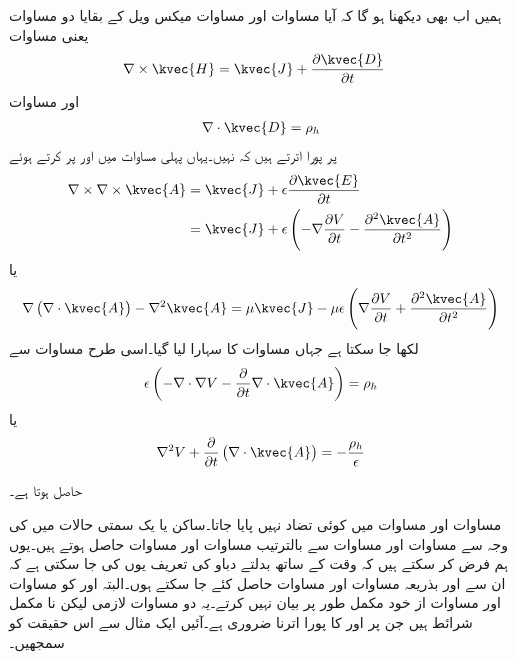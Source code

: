 ہمیں اب بھی دیکھنا ہو گا کہ آیا مساوات  اور مساوات  میکس ویل  کے بقایا دو مساوات یعنی مساوات  
\begin{align*}
\nabla \times \kvec{H}&=\kvec{J}+\frac{\partial \kvec{D}}{\partial t}
\end{align*}
اور مساوات 
\begin{align*}
\nabla \cdot \kvec{D}=\rho_h
\end{align*}
پر پورا اترتے ہیں کہ نہیں۔یہاں پہلی مساوات میں  اور   پر کرتے ہوئے 
\begin{align*}
\nabla \times \nabla \times \kvec{A}&=\kvec{J}+\epsilon \frac{\partial \kvec{E}}{\partial t}\\
&=\kvec{J}+\epsilon\left(-\nabla \frac{\partial V}{\partial t}- \frac{\partial^2 \kvec{A}}{\partial t^2} \right) 
\end{align*}
یا
\begin{align}\label{مساوات_میکس_ویل_بدلتی_ج}
\nabla \left(\nabla \cdot \kvec{A} \right)-\nabla^2 \kvec{A}=\mu \kvec{J}-\mu \epsilon \left(\nabla \frac{\partial V}{\partial t}+ \frac{\partial^2 \kvec{A}}{\partial t^2} \right)
\end{align}
لکھا جا سکتا ہے جہاں مساوات  کا سہارا لیا گیا۔اسی طرح مساوات  سے
\begin{align*}
\epsilon \left(-\nabla \cdot \nabla V -\frac{\partial}{\partial t}\nabla \cdot  \kvec{A} \right)=\rho_h
\end{align*}
یا
\begin{align}\label{مساوات_میکس_ویل_بدلتی_چ}
\nabla^2 V+\frac{\partial}{\partial t} \left(\nabla \cdot \kvec{A} \right)=-\frac{\rho_h}{\epsilon}
\end{align}

حاصل ہوتا ہے۔

مساوات  اور مساوات  میں کوئی تضاد  نہیں پایا جاتا۔ساکن یا یک سمتی حالات میں  کی وجہ سے  مساوات  اور مساوات  سے بالترتیب مساوات  اور مساوات  حاصل ہوتے ہیں۔یوں ہم فرض کر سکتے ہیں کہ وقت کے ساتھ بدلتے دباو کی تعریف یوں کی جا سکتی ہے کہ ان سے  اور  بذریعہ مساوات  اور مساوات  حاصل کئے جا سکتے ہوں۔البتہ  اور  کو مساوات  اور مساوات  از خود مکمل طور پر بیان نہیں کرتے۔یہ دو مساوات لازمی لیکن نا مکمل شرائط ہیں جن پر  اور  کا پورا اترنا ضروری ہے۔آئیں ایک مثال سے اس حقیقت کو سمجھیں۔

